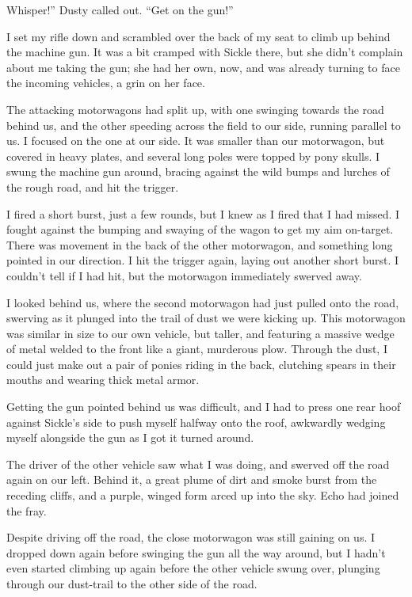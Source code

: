 \leavevmode{}Whisper!” Dusty called out. “Get on the gun!”

I set my rifle down and scrambled over the back of my seat to climb up behind the machine gun. It was a bit cramped with Sickle there, but she didn’t complain about me taking the gun; she had her own, now, and was already turning to face the incoming vehicles, a grin on her face.

The attacking motorwagons had split up, with one swinging towards the road behind us, and the other speeding across the field to our side, running parallel to us. I focused on the one at our side. It was smaller than our motorwagon, but covered in heavy plates, and several long poles were topped by pony skulls. I swung the machine gun around, bracing against the wild bumps and lurches of the rough road, and hit the trigger.

I fired a short burst, just a few rounds, but I knew as I fired that I had missed. I fought against the bumping and swaying of the wagon to get my aim on-target. There was movement in the back of the other motorwagon, and something long pointed in our direction. I hit the trigger again, laying out another short burst. I couldn’t tell if I had hit, but the motorwagon immediately swerved away.

I looked behind us, where the second motorwagon had just pulled onto the road, swerving as it plunged into the trail of dust we were kicking up. This motorwagon was similar in size to our own vehicle, but taller, and featuring a massive wedge of metal welded to the front like a giant, murderous plow. Through the dust, I could just make out a pair of ponies riding in the back, clutching spears in their mouths and wearing thick metal armor.

Getting the gun pointed behind us was difficult, and I had to press one rear hoof against Sickle’s side to push myself halfway onto the roof, awkwardly wedging myself alongside the gun as I got it turned around.

The driver of the other vehicle saw what I was doing, and swerved off the road again on our left. Behind it, a great plume of dirt and smoke burst from the receding cliffs, and a purple, winged form arced up into the sky. Echo had joined the fray.

Despite driving off the road, the close motorwagon was still gaining on us. I dropped down again before swinging the gun all the way around, but I hadn’t even started climbing up again before the other vehicle swung over, plunging through our dust-trail to the other side of the road.

